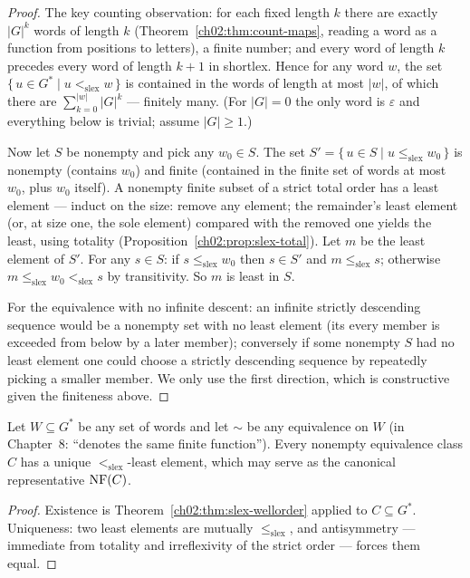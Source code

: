 \begin{proof}
The key counting observation: for each fixed length $k$ there are exactly
$|G|^{k}$ words of length $k$ (Theorem~\ref{ch02:thm:count-maps}, reading
a word as a function from positions to letters), a finite number; and
every word of length $k$ precedes every word of length $k + 1$ in
shortlex. Hence for any word $w$, the set
$\{\, u \in G^{*} \mid u <_{\mathrm{slex}} w \,\}$ is contained in the
words of length at most $|w|$, of which there are
$\sum_{k=0}^{|w|} |G|^{k}$ --- finitely many. (For $|G| = 0$ the only word
is $\varepsilon$ and everything below is trivial; assume $|G| \ge 1$.)

Now let $S$ be nonempty and pick any $w_0 \in S$. The set
$S' = \{\, u \in S \mid u \leq_{\mathrm{slex}} w_0 \,\}$ is nonempty
(contains $w_0$) and finite (contained in the finite set of words at most
$w_0$, plus $w_0$ itself). A nonempty finite subset of a strict total
order has a least element --- induct on the size: remove any element; the
remainder's least element (or, at size one, the sole element) compared
with the removed one yields the least, using totality
(Proposition~\ref{ch02:prop:slex-total}). Let $m$ be the least element of
$S'$. For any $s \in S$: if $s \leq_{\mathrm{slex}} w_0$ then
$s \in S'$ and $m \leq_{\mathrm{slex}} s$; otherwise
$m \leq_{\mathrm{slex}} w_0 <_{\mathrm{slex}} s$ by transitivity. So $m$
is least in $S$.

For the equivalence with no infinite descent: an infinite strictly
descending sequence would be a nonempty set with no least element (its
every member is exceeded from below by a later member); conversely if some
nonempty $S$ had no least element one could choose a strictly descending
sequence by repeatedly picking a smaller member. We only use the first
direction, which is constructive given the finiteness above.
\end{proof}

\begin{corollary}\label{ch02:cor:min-rep}
Let $W \subseteq G^{*}$ be any set of words and let $\sim$ be any
equivalence on $W$ (in Chapter~8: ``denotes the same finite function'').
Every nonempty equivalence class $C$ has a unique
$<_{\mathrm{slex}}$-least element, which may serve as the canonical
representative $\mathrm{NF}(C)$.
\end{corollary}

\begin{proof}
Existence is Theorem~\ref{ch02:thm:slex-wellorder} applied to
$C \subseteq G^{*}$. Uniqueness: two least elements are mutually
$\leq_{\mathrm{slex}}$, and antisymmetry --- immediate from totality and
irreflexivity of the strict order --- forces them equal.
\end{proof}


